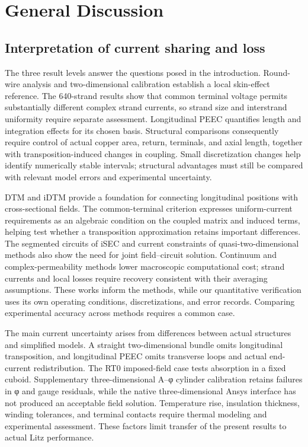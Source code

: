 \section{General Discussion}
\label{chapter:11}

\hypertarget{11.discussion.heading}{}
\subsection{Interpretation of current sharing and loss}

\hypertarget{11.discussion.p1}{}
The three result levels answer the questions posed in the introduction. Round-wire analysis and two-dimensional calibration establish a local skin-effect reference. The 640-strand results show that common terminal voltage permits substantially different complex strand currents, so strand size and interstrand uniformity require separate assessment. Longitudinal PEEC quantifies length and integration effects for its chosen basis. Structural comparisons consequently require control of actual copper area, return, terminals, and axial length, together with transposition-induced changes in coupling. Small discretization changes help identify numerically stable intervals; structural advantages must still be compared with relevant model errors and experimental uncertainty.

\hypertarget{11.discussion.p2}{}
DTM and iDTM \cite{P01,N01} provide a foundation for connecting longitudinal positions with cross-sectional fields. The common-terminal criterion expresses uniform-current requirements as an algebraic condition on the coupled matrix and induced terms, helping test whether a transposition approximation retains important differences. The segmented circuits of iSEC \cite{P02} and current constraints of quasi-two-dimensional methods \cite{P04} also show the need for joint field–circuit solution. Continuum and complex-permeability methods \cite{P05,P09} lower macroscopic computational cost; strand currents and local losses require recovery consistent with their averaging assumptions. These works inform the methods, while our quantitative verification uses its own operating conditions, discretizations, and error records. Comparing experimental accuracy across methods requires a common case.

\hypertarget{11.discussion.p3}{}
The main current uncertainty arises from differences between actual structures and simplified models. A straight two-dimensional bundle omits longitudinal transposition, and longitudinal PEEC omits transverse loops and actual end-current redistribution. The RT0 imposed-field case tests absorption in a fixed cuboid. Supplementary three-dimensional A–φ cylinder calibration retains failures in φ and gauge residuals, while the native three-dimensional Ansys interface has not produced an acceptable field solution. Temperature rise, insulation thickness, winding tolerances, and terminal contacts require thermal modeling and experimental assessment. These factors limit transfer of the present results to actual Litz performance.

